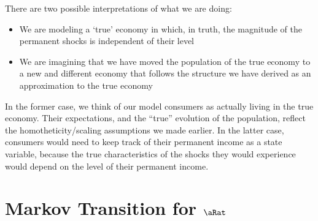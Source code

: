 \documentclass[../BufferStockTheory.tex]{subfiles}\usepackage{ApndxSteadyState}
\begin{document}
  There are two possible interpretations of what we are doing:
  \begin{itemize}
  \item We are modeling a `true' economy in which, in truth, the magnitude of the permanent shocks is independent of their level
  \item We are imagining that we have moved the population of the true economy to a new and different economy that follows the structure we have derived as an approximation to the true economy
  \end{itemize}

  In the former case, we think of our model consumers as actually living in the true economy.  Their expectations, and the ``true'' evolution of the population, reflect the homotheticity/scaling assumptions we made earlier.  In the latter case, consumers would need to keep track of their permanent income as a state variable, because the true characteristics of the shocks they would experience would depend on the level of their permanent income.

  \pagebreak


  \section{Markov Transition for $\aRat$}

  \begin{comment}
    Our derivations will be for consumers who are living in the `true' economy.  In that economy, the transition equation for $\aRat$ is:
    \subsection{Transition for $\aRat$}
    \begin{align}
      \aRat_{\tAbs+1} & = \Rfree (\PGro \pShk_{\tAbs+1})^{-1} \aRat_{\tAbs} + \tShk_{\tAbs+1} - \cFunc_{\tAbs+1}(\Rfree (\PGro \pShk_{\tAbs+1})^{-1}\aRat_{\tAbs}+\tShk_{\tAbs+1})
      \\                \Nxt{_{\tAbs+1}^{\aRat}(\aRat_{\tAbs+1}) & = \CDF_{\tAbs+1}^{\aRat}\left(\Rfree (\PGro \pShk_{\tAbs+1})^{-1} \aRat_{\tAbs} + \tShk_{\tAbs+1} - \cFunc_{\tAbs+1}(\Rfree (\PGro \pShk_{\tAbs+1})^{-1}\aRat_{\tAbs}+\tShk_{\tAbs+1})\right)
    \end{align}
  \end{comment}
\end{document}
